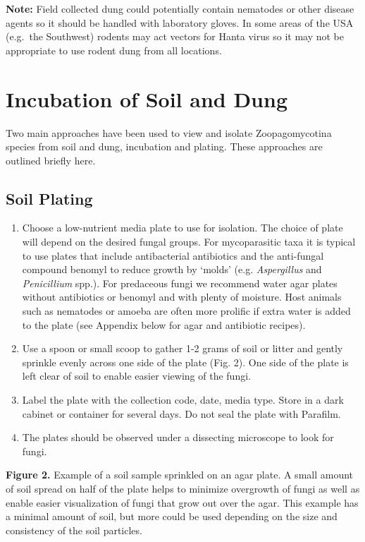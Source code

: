\documentclass[]{book}
\providecommand{\tightlist}{%
  \setlength{\itemsep}{0pt}\setlength{\parskip}{0pt}}
\begin{document}
\textbf{Note:} Field collected dung could potentially contain nematodes
or other disease agents so it should be handled with laboratory gloves.
In some areas of the USA (e.g.~the Southwest) rodents may act vectors
for Hanta virus so it may not be appropriate to use rodent dung from all
locations.

\section{Incubation of Soil and Dung}\label{incubation-of-soil-and-dung}

Two main approaches have been used to view and isolate Zoopagomycotina
species from soil and dung, incubation and plating. These approaches are
outlined briefly here.

\subsection{Soil Plating}\label{soil-plating}

\begin{enumerate}
\def\labelenumi{\arabic{enumi}.}
\tightlist
\item
  Choose a low-nutrient media plate to use for isolation. The choice of
  plate will depend on the desired fungal groups. For mycoparasitic taxa
  it is typical to use plates that include antibacterial antibiotics and
  the anti-fungal compound benomyl to reduce growth by `molds' (e.g.
  \emph{Aspergillus} and \emph{Penicillium} spp.). For predaceous fungi
  we recommend water agar plates without antibiotics or benomyl and with
  plenty of moisture. Host animals such as nematodes or amoeba are often
  more prolific if extra water is added to the plate (see Appendix below
  for agar and antibiotic recipes).
\item
  Use a spoon or small scoop to gather 1-2 grams of soil or litter and
  gently sprinkle evenly across one side of the plate (Fig. 2). One side
  of the plate is left clear of soil to enable easier viewing of the
  fungi.
\item
  Label the plate with the collection code, date, media type. Store in a
  dark cabinet or container for several days. Do {not} seal the plate
  with Parafilm.
\item
  The plates should be observed under a dissecting microscope to look
  for fungi.
\end{enumerate}

\textbf{Figure 2.} Example of a soil sample sprinkled on an agar plate.
A small amount of soil spread on half of the plate helps to minimize
overgrowth of fungi as well as enable easier visualization of fungi that
grow out over the agar. This example has a minimal amount of soil, but
more could be used depending on the size and consistency of the soil
particles.
\end{document}
